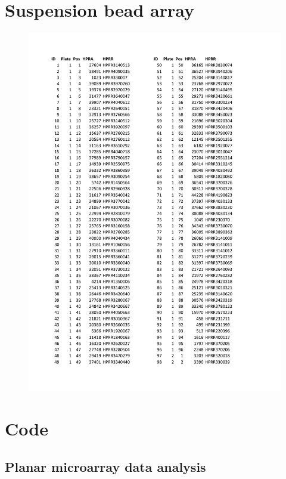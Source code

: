 \documentclass{article}
\begin{document}
\section{Suspension bead array}\label{sba_full}
\begin{figure}[H]
	\centering
	\includegraphics[clip, trim=1.8cm 2.3cm 1.8cm 2cm, width=0.92\linewidth]{pages/AK_SBA.pdf}
\end{figure}


\section{Code}
\subsection{Planar microarray data analysis}\label{code_42k}
\inputminted[linenos=true, frame=topline, label=42k\_analysis.R]{r}{code/42k_analysis.R}
\inputminted[linenos=true, frame=topline, label=42k\_plot.R]{r}{code/42k_plot.R}
\end{document}
